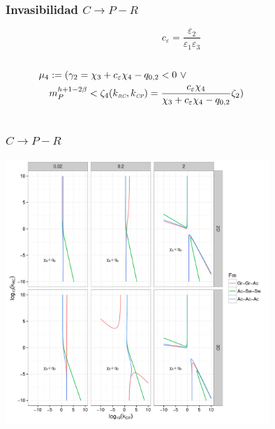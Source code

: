 \documentclass[11 pt,t]{beamer}
\newcommand{\CP}{\textit{\tiny CP}}
\newcommand{\RC}{\textit{\tiny RC}}
\begin{document}
\begin{frame}
  \frametitle{Invasibilidad $C \to P-R$}
  \begin{equation}
  c_\varepsilon = \frac{\varepsilon_2}{\varepsilon_1\varepsilon_3}
\end{equation}
\begin{columns}
  \begin{column}{0.7\textwidth}
    \begin{equation*}
      \begin{aligned}
        \mu_4 &:= (\gamma_2 = \chi_3 + c_\varepsilon \chi_4 - q_{0,2} < 0 \ \lor \\ &m_P^{h + 1 - 2\beta} < \zeta_4(k_{\RC},k_{\CP}) = \frac{c_\varepsilon \chi_4}{\chi_3 + c_\varepsilon \chi_4 - q_{0,2}} \zeta_2 )
      \end{aligned}
    \end{equation*}
  \end{column}
  \begin{column}{0.3\textwidth}
    \begin{center}
      \resizebox{0.3\textwidth}{!}{}
    \end{center}
  \end{column}
  \end{columns}

\end{frame}
\begin{frame}
  \frametitle{$C \to P-R$}
  \centering
  \includegraphics[width = 0.75\textwidth]{../manuscript/Plots/NecCPR.pdf}
\end{frame}
\end{document}
